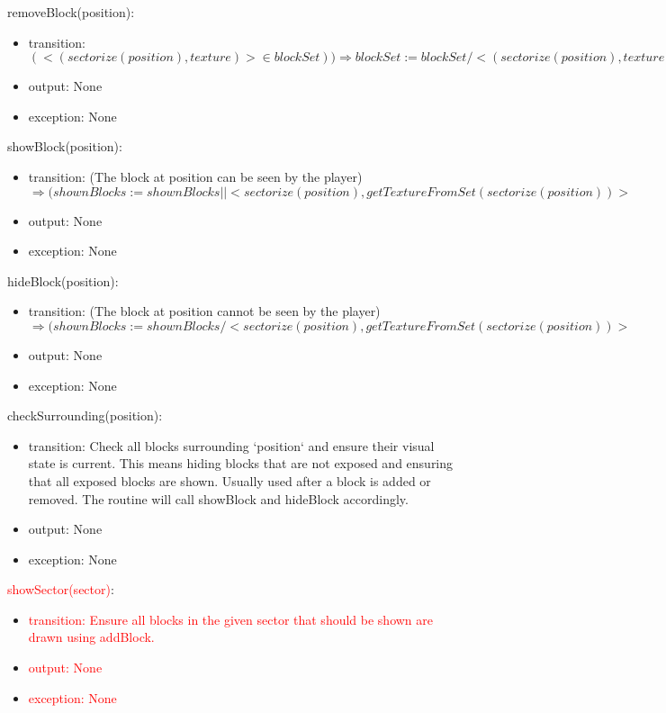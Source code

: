\documentclass[12pt]{article}
\begin{document}
\noindent removeBlock(position):
\begin{itemize}
\item transition: $(< (sectorize(position), texture) > \in blockSet)) \Rightarrow
blockSet := blockSet / < (sectorize(position), texture) >$
\item output: None
\item exception: None\\
\end{itemize}


\noindent showBlock(position):
\begin{itemize}
\item transition: (The block at position can be seen by the player) $\Rightarrow
(shownBlocks := shownBlocks|| < sectorize(position), getTextureFromSet(sectorize(position)) > $
\item output: None
\item exception: None\\
\end{itemize}

\noindent hideBlock(position):
\begin{itemize}
\item transition: (The block at position cannot be seen by the player) $\Rightarrow
(shownBlocks := shownBlocks / < sectorize(position), getTextureFromSet(sectorize(position)) > $
\item output: None
\item exception: None\\
\end{itemize}

\noindent checkSurrounding(position):
\begin{itemize}
\item transition: Check all blocks surrounding `position` and ensure their visual state is current. This means hiding blocks that are not exposed and
ensuring that all exposed blocks are shown. Usually used after a block
is added or removed. The routine will call showBlock and hideBlock accordingly.
\item output: None
\item exception: None\\
\end{itemize}

\noindent \textcolor{red}{showSector(sector)}:
\begin{itemize}
\item \textcolor{red}{transition: Ensure all blocks in the given sector that should be shown are drawn using addBlock.}
\item \textcolor{red}{output: None} 
\item \textcolor{red}{exception: None}\\
\end{itemize}
\end{document}
